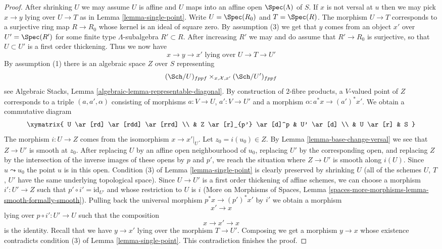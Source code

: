 \begin{proof}
After shrinking $U$ we may assume $U$ is affine and $U$ maps into an
affine open $\Spec(\Lambda)$ of $S$. If $x$ is not versal at $u$ then
we may pick $x \to y$ lying over $U \to T$ as in
Lemma \ref{lemma-single-point}. Write $U = \Spec(R_0)$ and $T = \Spec(R)$.
The morphism $U \to T$ corresponds to a surjective ring map
$R \to R_0$ whose kernel is an ideal of square zero.
By assumption (3) we get that $y$ comes from an object $x'$ over
$U' = \Spec(R')$ for some finite type $\Lambda$-subalgebra
$R' \subset R$. After increasing $R'$ we may and do assume that
$R' \to R_0$ is surjective, so that $U \subset U'$ is a first order thickening.
Thus we now have
$$
x \to y \to x'
\text{ lying over }
U \to T \to U'
$$
By assumption (1) there is an algebraic space $Z$ over $S$ representing
$$
(\Sch/U)_{fppf} \times_{x, \mathcal{X}, x'} (\Sch/U')_{fppf}
$$
see Algebraic Stacks, Lemma \ref{algebraic-lemma-representable-diagonal}.
By construction of $2$-fibre products, a $V$-valued point of $Z$
corresponds to a triple $(a, a', \alpha)$ consisting of morphisms
$a : V \to U$, $a' : V \to U'$ and a morphism $\alpha : a^*x \to (a')^*x'$.
We obtain a commutative diagram
$$
\xymatrix{
U \ar[rd] \ar[rdd] \ar[rrd] \\
& Z \ar[r]_{p'} \ar[d]^p & U' \ar[d] \\
& U \ar[r] & S
}
$$
The morphism $i : U \to Z$ comes from the isomorphism $x \to x'|_U$.
Let $z_0 = i(u_0) \in Z$. By Lemma \ref{lemma-base-change-versal}
we see that $Z \to U'$ is smooth at $z_0$. After replacing $U$ by an
affine open neighbourhood of $u_0$, replacing $U'$ by the corresponding
open, and replacing $Z$ by the intersection of the inverse images
of these opens by $p$ and $p'$, we reach the situation where
$Z \to U'$ is smooth along $i(U)$. Since $u \leadsto u_0$ the point
$u$ is in this open. Condition (3) of Lemma \ref{lemma-single-point}
is clearly preserved by shrinking $U$ (all of the schemes $U$, $T$, $U'$
have the same underlying topological space).
Since $U \to U'$ is a first order thickening of affine schemes,
we can choose a morphism $i' : U' \to Z$
such that $p' \circ i' = \text{id}_{U'}$ and
whose restriction to $U$ is $i$
(More on Morphisms of Spaces, Lemma
\ref{spaces-more-morphisms-lemma-smooth-formally-smooth}).
Pulling back the universal morphism $p^*x \to (p')^*x'$ by $i'$
we obtain a morphism
$$
x' \to x
$$
lying over $p \circ i' : U' \to U$ such that the composition
$$
x \to x' \to x
$$
is the identity. Recall that we have $y \to x'$ lying over
the morphism $T \to U'$. Composing we get a morphism
$y \to x$ whose existence contradicts condition
(3) of Lemma \ref{lemma-single-point}.
This contradiction finishes the proof.
\end{proof}






